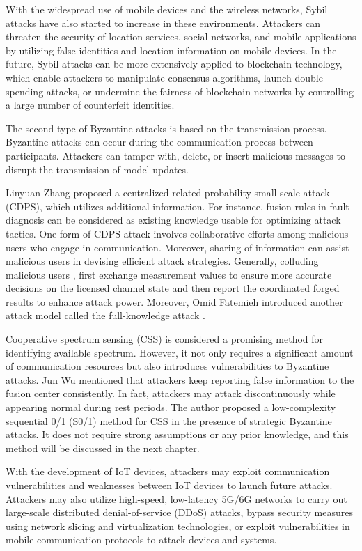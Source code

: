 \documentclass[conference]{IEEEtran}
\begin{document}
With the widespread use of mobile devices and the wireless networks, Sybil attacks have also 
started to increase in these environments. Attackers can threaten the security of location services, 
social networks, and mobile applications by utilizing false identities and location information on
mobile devices. In the future, Sybil attacks can be more extensively applied to blockchain 
technology, which enable attackers to manipulate consensus algorithms, launch double-spending 
attacks, or undermine the fairness of blockchain networks by controlling a large number of 
counterfeit identities.

The second type of Byzantine attacks is based on the transmission process. Byzantine attacks can 
occur during the communication process between participants. Attackers can tamper with, delete, or 
insert malicious messages to disrupt the transmission of model updates.

Linyuan Zhang \cite{b114} proposed a centralized related probability small-scale attack (CDPS), 
which utilizes additional information. For instance, fusion rules in fault diagnosis \cite{b115} can be 
considered as existing knowledge usable for optimizing attack tactics. One form of CDPS attack 
involves collaborative efforts among malicious users who engage in communication. Moreover, sharing 
of information can assist malicious users in devising efficient attack strategies. Generally, 
colluding malicious users \cite{b116},\cite{b117} first exchange measurement values to ensure more accurate decisions 
on the licensed channel state and then report the coordinated forged results to enhance attack power. 
Moreover, Omid Fatemieh introduced another attack model called the full-knowledge attack \cite{b118}.

Cooperative spectrum sensing (CSS) is considered a promising method for identifying available 
spectrum. However, it not only requires a significant amount of communication resources but also 
introduces vulnerabilities to Byzantine attacks. Jun Wu \cite{b119} mentioned that attackers keep reporting 
false information to the fusion center consistently. In fact, attackers may attack discontinuously
while appearing normal during rest periods. The author proposed a low-complexity sequential 0/1 
(S0/1) method for CSS in the presence of strategic Byzantine attacks. It does not require strong 
assumptions or any prior knowledge, and this method will be discussed in the next chapter.

With the development of IoT devices, attackers may exploit communication vulnerabilities and 
weaknesses between IoT devices to launch future attacks. Attackers may also utilize high-speed, 
low-latency 5G/6G networks to carry out large-scale distributed denial-of-service (DDoS) attacks,
bypass security measures using network slicing and virtualization technologies, or exploit 
vulnerabilities in mobile communication protocols to attack devices and systems.
\end{document}
